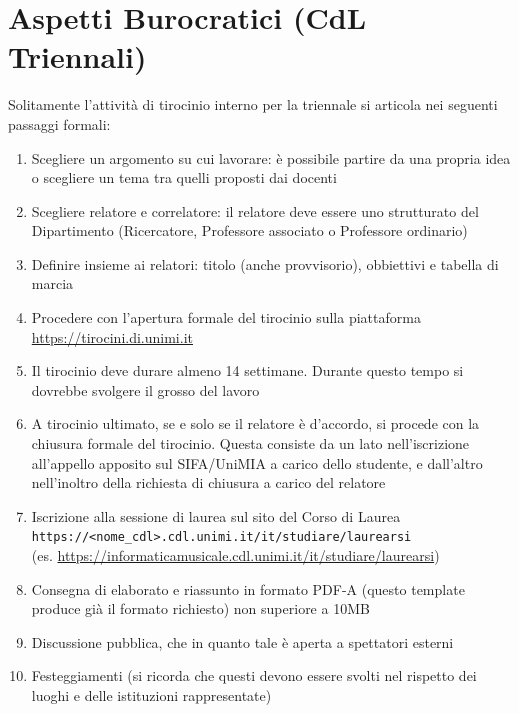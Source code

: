 \documentclass[12pt]{report}
\begin{document}
\section{Aspetti Burocratici (CdL Triennali)}
Solitamente l'attività di tirocinio interno per la triennale si articola nei seguenti passaggi formali:
\begin{enumerate}
    \item Scegliere un argomento su cui lavorare: è possibile partire da una propria idea o scegliere un tema tra quelli proposti dai docenti
    \item Scegliere relatore e correlatore: il relatore deve essere uno strutturato del Dipartimento (Ricercatore, Professore associato o Professore ordinario)
    \item Definire insieme ai relatori: titolo (anche provvisorio), obbiettivi e tabella di marcia
    \item Procedere con l'apertura formale del tirocinio sulla piattaforma\\ \url{https://tirocini.di.unimi.it}
    \item Il tirocinio deve durare almeno 14 settimane. Durante questo tempo si dovrebbe svolgere il grosso del lavoro
    \item A tirocinio ultimato, se e solo se il relatore è d'accordo, si procede con la chiusura formale del tirocinio. Questa consiste da un lato nell'iscrizione all'appello apposito sul SIFA/UniMIA a carico dello studente, e dall'altro nell'inoltro della richiesta di chiusura a carico del relatore
    \item Iscrizione alla sessione di laurea sul sito del Corso di Laurea\\ \texttt{https://<nome\_cdl>.cdl.unimi.it/it/studiare/laurearsi}\\ (es. \url{https://informaticamusicale.cdl.unimi.it/it/studiare/laurearsi})
    \item Consegna di elaborato e riassunto in formato PDF-A (questo template produce già il formato richiesto) non superiore a 10MB 
    \item Discussione pubblica, che in quanto tale è aperta a spettatori esterni
    \item Festeggiamenti (si ricorda che questi devono essere svolti nel rispetto dei luoghi e delle istituzioni rappresentate)
\end{enumerate}
\end{document}
